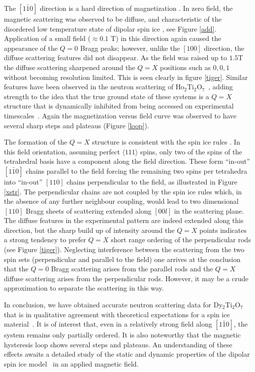 \documentclass[global,twocolumn]{svjour}
\begin{document}
The $[1\bar{1}0]$ direction is a hard direction of
magnetization \cite{Cornelius}. In zero field, the magnetic scattering was
observed to be diffuse, and characteristic of the disordered 
low temperature state of dipolar spin ice
\cite{newprl}, see Figure \ref{add}. 
Application of a small field ($\approx 0.1$ T) in this direction again caused
the appearance of the $Q = 0$ Bragg peaks; however, unlike the $[100]$ 
direction, the diffuse scattering features did not
disappear.  As the field was raised up to $1.5$T the  diffuse scattering 
sharpened around the $Q = X$ positions such as $0,0,1$ without becoming 
resolution limited. This is seen
clearly in figure \ref{tiger}. 
Similar features have been observed in the neutron scattering of  
Ho$_2$Ti$_2$O$_7$~\cite{prl1,dten}, adding strength to the idea that the true
ground state of these systems is a $Q = X$ structure that is dynamically
inhibited from being accessed on experimental timescales~\cite{Michel}. 
Again the magnetization versus
field curve was observed to have several sharp steps and plateaus 
(Figure \ref{loop}). 
 
The formation of the $Q = X$ structure is consistent with the spin ice 
rules \cite{prl1}.
In this field orientation, assuming perfect $\langle 111\rangle$
spins, only two of the spins of the tetrahedral basis have a component along
the field direction. These form ``in-out'' $[1\bar{1}0]$ 
chains parallel to the field
forcing the remaining two spins per tetrahedra into ``in-out'' 
$[110]$ chains
perpendicular to the field, as illustrated in Figure \ref{xstr}. The
perpendicular chains are not coupled by the spin ice rules which, in the
absence of any further neighbour coupling, would 
lead to two dimensional $[110]$ Bragg sheets
of scattering extended along $[00l]$ in the scattering plane. 
The diffuse features in the
experimental pattern are indeed extended along this direction, 
but the sharp build up of intensity around the $Q = X$ points
indicates a strong tendency to prefer $Q = X$ short range ordering of the
perpendicular rods (see Figure \ref{tiger}).  
Neglecting interference between the scattering from the 
two spin sets
(perpendicular and parallel to the field) one arrives at the conclusion that
the $Q = 0$ Bragg scattering arises from the parallel rods and the $Q = X$
diffuse scattering arises from the perpendicular rods. However, 
it may be a crude approximation to separate the scattering in this way. 

In conclusion, we have obtained accurate neutron scattering data for 
Dy$_2$Ti$_2$O$_7$ that is in qualitative agreement with theoretical
expectations for a spin ice material~\cite{prl1,newprl,jpcm,byron}. 
It is of interest that, even in 
a relatively strong field along $[1\bar{1}0]$, the system remains only
partially ordered. It is also noteworthy that the magnetic hysteresis loop
shows several steps and plateaus. An understanding of these effects awaits a
detailed study of the static and dynamic properties of the 
dipolar spin ice model~\cite{byron} in an applied magnetic field. 
\end{document}
